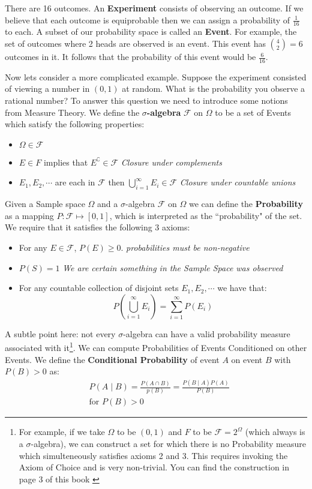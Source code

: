 \documentclass[]{article}
\theoremstyle{mattstyle}
\theoremstyle{definition}
\begin{document}
There are 16 outcomes. An \textbf{Experiment} consists of observing an outcome. If we believe that each outcome is equiprobable then we can assign a probability of \(\frac{1}{16}\) to each. A subset of our probability space is called an \textbf{Event}. For example, the set of outcomes where 2 heads are observed is an event. This event has ${4\choose 2}=6$ outcomes in it. It follows that the probability of this event would be $\frac{6}{16}$. 

Now lets consider a more complicated example. Suppose the experiment consisted of viewing a number in $(0,1)$ at random. What is the probability you observe a rational number? To answer this question we need to introduce some notions from Measure Theory. We define the \textbf{\(\sigma\)-algebra} \(\mathcal{F}\) on \(\Omega\) to be a set of Events which satisfy the following properties:
 \begin{itemize}
 	\item \(\Omega \in \mathcal{F}\)
 	\item \(E \in F\) implies that \(E^{\complement} \in \mathcal{F}\) \emph{Closure under complements}
 	\item \(E_1, E_2, \cdots\) are each in \(\mathcal{F}\) then \(\bigcup_{i=1}^{\infty} E_i \in \mathcal{F}\) \emph{Closure under countable unions}
 \end{itemize}

Given a Sample space $\Omega$ and a $\sigma$-algebra $\mathcal{F}$ on $\Omega$ we can define the \textbf{Probability} as a mapping \(P: \mathcal{F} \mapsto [0,1] \), which is interpreted as the ``probability" of the set. We require that it satisfies the following 3 axioms:
\begin{itemize}
	\item For any \( E \in \mathcal{F} \), \(P(E) \ge 0.\) \emph{probabilities must be non-negative}
	\item \(P(S)=1\) \emph{We are certain something in the Sample Space was observed}
	\item For any countable collection of disjoint sets \(E_1, E_2, \cdots \) we have that: $$P\left(\bigcup_{i=1}^{\infty} E_i\right) = \sum_{i=1}^{\infty} P\left(E_i\right)$$
\end{itemize}

A subtle point here: not every $\sigma$-algebra can have a valid probability measure associated with it\footnote{For example, if we take $\Omega$ to be $(0,1)$ and $F$ to be $\mathcal{F}=2^{\Omega}$ (which always is a $\sigma$-algebra), we can construct a set for which there is no Probability measure which simulteneously satisfies axioms 2 and 3. This requires invoking the Axiom of Choice and is very non-trivial. You can find the construction in page 3 of this book \cite{rosenthalbook}}. We can compute Probabilities of Events Conditioned on other Events. We define the \textbf{Conditional Probability} of event \(A\) on event \(B\) with \(P(B) > 0\) as:
\begin{align*}
&P(A \mid B) = \frac{P(A \cap B)}{p(B)} = \frac{P(B \mid A)P(A)}{P(B)}\\
&\text{for $P(B) > 0$}
\end{align*}
\end{document}
